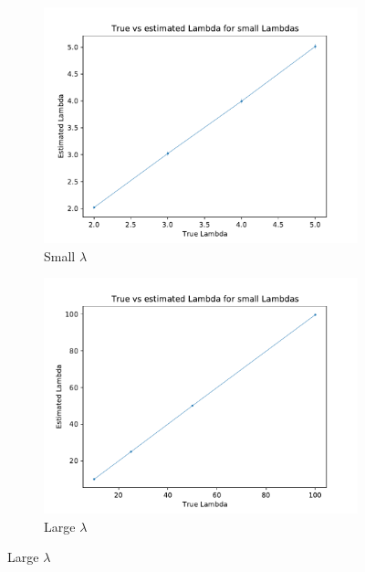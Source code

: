 \documentclass[12pt]{article}
\begin{document}
 \begin{figure}[h!]
	
	
	
	\begin{subfigure}[h!]{0.8\textwidth}
		\centering
		\includegraphics[width=\textwidth]{fig1.pdf}
		\caption{Small $\lambda$}
		
	\end{subfigure}
	
	\begin{subfigure}[h!]{0.8\textwidth}
		\centering
		\includegraphics[width=\textwidth]{fig2.pdf}
		\caption{Large $\lambda$}
		
	\end{subfigure}	
\end{figure}
\end{document}
